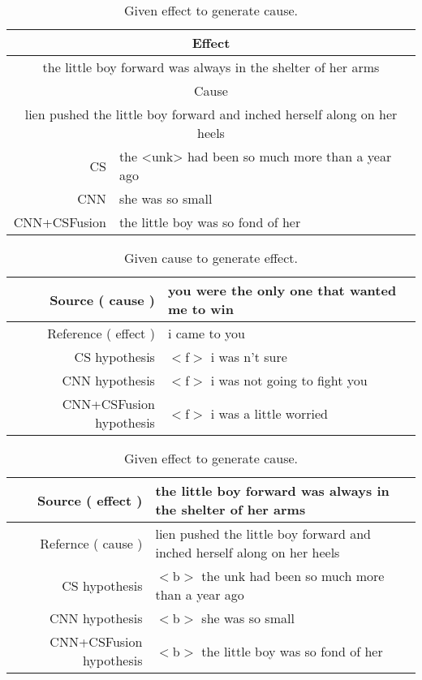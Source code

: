 {\begin{table*}[th]
    \centering
    \small
    \begin{tabular}{|r|l|}%
    \hline
    \multicolumn{2}{|c|}{Effect}\\ 
    \hline
    \multicolumn{2}{|c|}{the little boy forward was always in the shelter of her arms}\\ 
    \hline
    \multicolumn{2}{|c|}{Cause} \\
    \hline
    \multicolumn{2}{|c|}{lien pushed the little boy forward and inched herself along on her heels}\\ 
    \hline
    CS & the <unk> had been so much more than a year ago \\
    \hline
    CNN & she was so small \\
    \hline
    CNN+CSFusion & the little boy was so fond of her \\
    \hline
    \end{tabular}
    \caption{Given effect to generate cause.}
    \label{tab:effect_exp}
\end{table*}
}%

\begin{table*}[th]
    \centering
    \small
    \begin{tabular}{|r|l|}%
    \hline
    Source ( cause ) & you were the only one that wanted me to win \\ 
    \hline
    Reference ( effect ) & i came to you \\ 
    \hline
    CS hypothesis & $<$f$>$ i was n't sure \\
    \hline
    CNN hypothesis & $<$f$>$ i was not going to fight you \\
    \hline
    CNN+CSFusion hypothesis & $<$f$>$ i was a little worried \\
    \hline
    \end{tabular}
    \caption{Given cause to generate effect.}
    \label{tab:cause_exp}
\end{table*}

\begin{table*}[th]
    \centering
    \small
    \begin{tabular}{|r|l|}%
    \hline
    Source ( effect ) & the little boy forward was always in the shelter of her arms \\ 
    \hline
    Refernce ( cause ) & lien pushed the little boy forward and inched herself along on her heels \\ 
    \hline
    CS hypothesis & $<$b$>$ the unk had been so much more than a year ago \\
    \hline
    CNN hypothesis & $<$b$>$ she was so small \\
    \hline
    CNN+CSFusion hypothesis & $<$b$>$ the little boy was so fond of her \\
    \hline
    \end{tabular}
    \caption{Given effect to generate cause.}
    \label{tab:effect_exp}
\end{table*}
